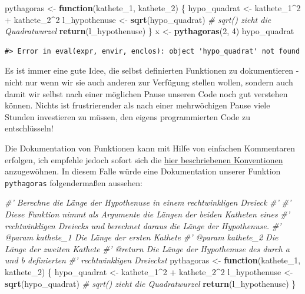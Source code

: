 \documentclass[]{tufte-book}
\newenvironment{Shaded}{}{}
\newcommand{\KeywordTok}[1]{\textcolor[rgb]{0.00,0.44,0.13}{\textbf{#1}}}
\newcommand{\DecValTok}[1]{\textcolor[rgb]{0.25,0.63,0.44}{#1}}
\newcommand{\StringTok}[1]{\textcolor[rgb]{0.25,0.44,0.63}{#1}}
\newcommand{\CommentTok}[1]{\textcolor[rgb]{0.38,0.63,0.69}{\textit{#1}}}
\newcommand{\ControlFlowTok}[1]{\textcolor[rgb]{0.00,0.44,0.13}{\textbf{#1}}}
\newcommand{\OperatorTok}[1]{\textcolor[rgb]{0.40,0.40,0.40}{#1}}
\newcommand{\NormalTok}[1]{#1}
\begin{document}
\begin{Shaded}
\begin{Highlighting}[]
\NormalTok{pythagoras <-}\StringTok{ }\ControlFlowTok{function}\NormalTok{(kathete_}\DecValTok{1}\NormalTok{, kathete_}\DecValTok{2}\NormalTok{) \{}
\NormalTok{    hypo_quadrat <-}\StringTok{ }\NormalTok{kathete_}\DecValTok{1}\OperatorTok{^}\DecValTok{2} \OperatorTok{+}\StringTok{ }\NormalTok{kathete_}\DecValTok{2}\OperatorTok{^}\DecValTok{2}
\NormalTok{    l_hypothenuse <-}\StringTok{ }\KeywordTok{sqrt}\NormalTok{(hypo_quadrat)  }\CommentTok{# sqrt() zieht die Quadratwurzel}
    \KeywordTok{return}\NormalTok{(l_hypothenuse)}
\NormalTok{\}}
\NormalTok{x <-}\StringTok{ }\KeywordTok{pythagoras}\NormalTok{(}\DecValTok{2}\NormalTok{, }\DecValTok{4}\NormalTok{)}
\NormalTok{hypo_quadrat}
\end{Highlighting}
\end{Shaded}

\begin{verbatim}
#> Error in eval(expr, envir, enclos): object 'hypo_quadrat' not found
\end{verbatim}

Es ist immer eine gute Idee, die selbst definierten Funktionen zu
dokumentieren - nicht nur wenn wir sie auch anderen zur Verfügung
stellen wollen, sondern auch damit wir selbst nach einer möglichen Pause
unseren Code noch gut verstehen können. Nichts ist frustrierender als
nach einer mehrwöchigen Pause viele Stunden investieren zu müssen, den
eigens programmierten Code zu entschlüsseln!

Die Dokumentation von Funktionen kann mit Hilfe von einfachen
Kommentaren erfolgen, ich empfehle jedoch sofort sich die
\href{https://r-pkgs.org/man.html\#man-functions}{hier beschriebenen
Konventionen} anzugewöhnen. In diesem Falle würde eine Dokumentation
unserer Funktion \texttt{pythagoras} folgendermaßen aussehen:

\begin{Shaded}
\begin{Highlighting}[]
\CommentTok{#' Berechne die Länge der Hypothenuse in einem rechtwinkligen Dreieck}
\CommentTok{#' }
\CommentTok{#' Diese Funktion nimmt als Argumente die Längen der beiden Katheten eines}
\CommentTok{#'  rechtwinkligen Dreiecks und berechnet daraus die Länge der Hypothenuse.}
\CommentTok{#' @param kathete_1 Die Länge der ersten Kathete}
\CommentTok{#' @param kathete_2 Die Länge der zweiten Kathete}
\CommentTok{#' @return Die Länge der Hypothenuse des durch a und b definierten }
\CommentTok{#'  rechtwinkligen Dreieckst}
\NormalTok{pythagoras <-}\StringTok{ }\ControlFlowTok{function}\NormalTok{(kathete_}\DecValTok{1}\NormalTok{, kathete_}\DecValTok{2}\NormalTok{) \{}
\NormalTok{    hypo_quadrat <-}\StringTok{ }\NormalTok{kathete_}\DecValTok{1}\OperatorTok{^}\DecValTok{2} \OperatorTok{+}\StringTok{ }\NormalTok{kathete_}\DecValTok{2}\OperatorTok{^}\DecValTok{2}
\NormalTok{    l_hypothenuse <-}\StringTok{ }\KeywordTok{sqrt}\NormalTok{(hypo_quadrat)  }\CommentTok{# sqrt() zieht die Quadratwurzel}
    \KeywordTok{return}\NormalTok{(l_hypothenuse)}
\NormalTok{\}}
\end{Highlighting}
\end{Shaded}
\end{document}
